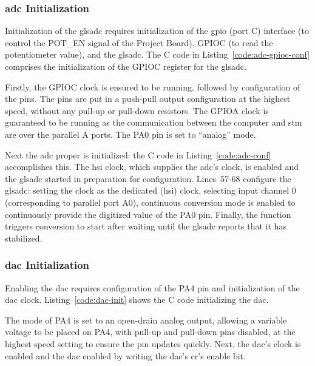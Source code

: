 \subsubsection{\gls{adc} Initialization}
Initialization of the gls{adc} requires initialization of the \gls{gpio}
(port C) interface (to control the POT\_EN signal of the Project Board),
GPIOC (to read the potentiometer value), and the gls{adc}. The C code in
Listing~\ref{code:adc-gpioc-conf} comprises the initialization of the
GPIOC register for the gls{adc}.


Firstly, the GPIOC clock is ensured to be running, followed by
configuration of the pins. The pins are put in a push-pull output
configuration at the highest speed, without any pull-up or pull-down
resistors. The GPIOA clock is guaranteed to be running as the
communication between the computer and \gls{stm} are over the parallel
A ports. The PA0 pin is set to ``analog'' mode. \\


Next the \gls{adc} proper is initialized: the C code in
Listing~\ref{code:adc-conf} accomplishes this.  The \gls{hsi} clock, which
supplies the \gls{adc}'s clock, is enabled and the gls{adc} started in preparation
for configuration. Lines~57-68 configure the gls{adc}: setting the clock as
the dedicated (\gls{hsi}) clock, selecting input channel 0 (corresponding to
parallel port A0), continuous conversion mode is enabled to continuously
provide the digitized value of the PA0 pin. Finally, the function
triggers conversion to start after waiting until the gls{adc} reports that it
has stabilized.

\subsubsection{\gls{dac} Initialization}
Enabling the \gls{dac} requires configuration of the PA4 pin and
initialization of the \gls{dac} clock. Listing~\ref{code:dac-init} shows
the C code initializing the \gls{dac}.


The mode of PA4 is set to an open-drain analog output, allowing a
variable voltage to be placed on PA4, with pull-up and pull-down
pins disabled, at the highest speed setting to ensure the pin updates
quickly. Next, the \gls{dac}'s clock is enabled and the \gls{dac}
enabled by writing the \gls{dac}'s \gls{cr}'s enable bit.

